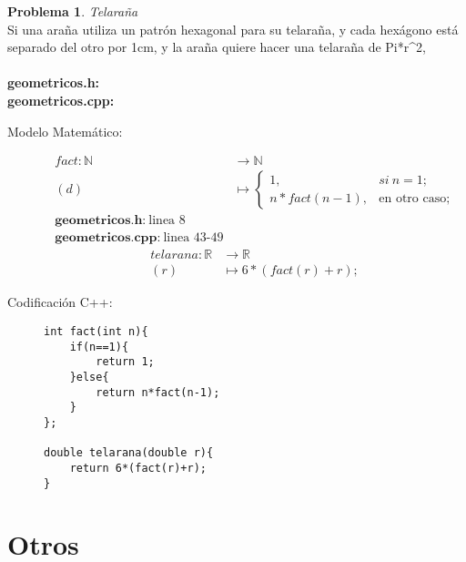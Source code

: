 \documentclass{article}
\theoremstyle{plain}
\theoremstyle{definition}
\newtheorem{problem}{Problema}
\begin{document}
\begin{problem} \emph{Telaraña}\\
Si una araña utiliza un patrón hexagonal para su telaraña, y cada hexágono está separado del otro por 1cm, y la araña quiere hacer una telaraña de Pi*r^2,\\ \\
\textbf{geometricos.h:}\ \\
\textbf{geometricos.cpp:}\ 
%
\begin{description}
\item[Modelo Matemático:]
%
\begin{align*}
fact: \mathbb{N} &\to \mathbb{N}\\
(d) &\mapsto
\begin{cases}
1,& si\ n=1;\\
n*fact(n-1),& \text{en otro caso;}
\end{cases}\\
\textbf{geometricos.h:}\ \text{linea 8}\\
\textbf{geometricos.cpp:}\ \text{linea 43-49}
\end{align*}
\begin{align*}
telarana: \mathbb{R} &\to \mathbb{R}\\
(r) &\mapsto 6*(fact(r)+r);
\end{align*}
%
\item[Codificación \textsf{C++}:]\hfill
%
\begin{verbatim}
int fact(int n){
    if(n==1){
        return 1;
    }else{
        return n*fact(n-1);
    }
};

double telarana(double r){
    return 6*(fact(r)+r);
}
\end{verbatim}
\end{description}
\end{problem}

\section{Otros}
\end{document}
